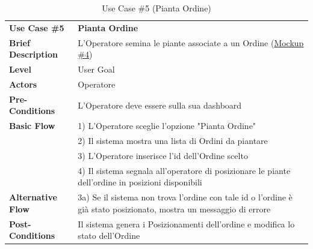 \documentclass{article}
\begin{document}
\begin{table}[p]
    \begin{tabularx}{\textwidth}{ | l  X | }
        \rowcolor{lightgray!70}
        \hline
        \textbf{Use Case \#5} & \textbf{Pianta Ordine }\\[0.5ex]
        \textbf{Brief Description} & L'Operatore semina le piante associate a un Ordine (\hyperref[fig:mockup_4]{Mockup \#4})\\
        \rowcolor{blue!10}
        \textbf{Level} & User Goal\\
        \textbf{Actors} & Operatore \\
        \rowcolor{blue!10}
        \textbf{Pre-Conditions} & L'Operatore deve essere sulla sua dashboard\\
        \textbf{Basic Flow} & 1) L'Operatore sceglie l'opzione "Pianta Ordine"\\
        & 2) Il sistema mostra una lista di Ordini da piantare\\
        & 3) L'Operatore inserisce l'id dell'Ordine scelto\\
        & 4) Il sistema segnala all'operatore di posizionare le piante dell'ordine in posizioni disponibili\\
        \rowcolor{blue!10}
        \textbf{Alternative Flow} & 3a) Se il sistema non trova l'ordine con tale id o l'ordine è già stato posizionato, mostra un messaggio di errore\\
        \textbf{Post-Conditions} & Il sistema genera i Posizionamenti dell'ordine e modifica lo stato dell'Ordine\\
        \hline
    \end{tabularx}
    \caption{Use Case \#5 (Pianta Ordine)}
\end{table}
\end{document}
